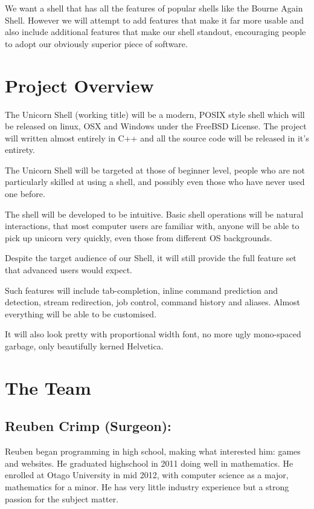 \documentclass[a4paper,12pt]{article}
\begin{document}
We want a shell that has all the features of popular shells like the Bourne Again Shell. However we will attempt to add features that make it far more usable and also include additional features that make our shell standout, encouraging people to adopt our obviously superior piece of software.

\section*{Project Overview}

The Unicorn Shell (working title) will be a modern, POSIX style shell which will be released on linux, OSX and Windows under the FreeBSD License. The project will written almost entirely in C++ and all the source code will be released in it's entirety.

The Unicorn Shell will be targeted at those of beginner level, people who are not particularly skilled at using a shell, and possibly even those who have never used one before.

The shell will be developed to be intuitive. Basic shell operations will be natural interactions, that most computer users are familiar with, anyone will be able to pick up unicorn very quickly, even those from different OS backgrounds.

Despite the target audience of our Shell, it will still provide the full feature set that advanced users would expect.

Such features will include tab-completion, inline command prediction and detection, stream redirection, job control,  command history and aliases. Almost everything will be able to be customised.

It will also look pretty with proportional width font, no more ugly mono-spaced garbage, only beautifully kerned Helvetica. 

\pagebreak
\section*{The Team}

\subsection*{Reuben Crimp (Surgeon):}
Reuben began programming in high school, making what interested him: games and websites. He graduated highschool in 2011 doing well in mathematics. He enrolled at Otago University in mid 2012, with computer science as a major, mathematics for a minor. He has very little industry experience but a strong passion for the subject matter.
\end{document}
